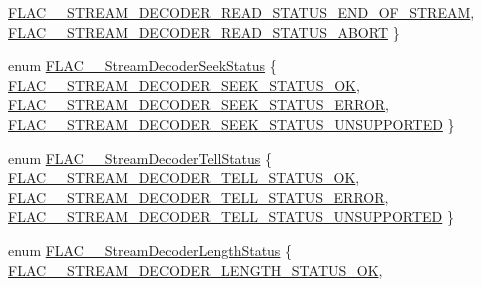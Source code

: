 \begin{DoxyCompactItemize}
\mbox{\hyperlink{group__flac__stream__decoder_ggad793ead451206c64a91dc0b851027b93a0a0687d25dc9f7163e6e5e294672170f}{F\+L\+A\+C\+\_\+\+\_\+\+S\+T\+R\+E\+A\+M\+\_\+\+D\+E\+C\+O\+D\+E\+R\+\_\+\+R\+E\+A\+D\+\_\+\+S\+T\+A\+T\+U\+S\+\_\+\+E\+N\+D\+\_\+\+O\+F\+\_\+\+S\+T\+R\+E\+AM}}, 
\mbox{\hyperlink{group__flac__stream__decoder_ggad793ead451206c64a91dc0b851027b93a923123aebb349e35662e35a7621b7535}{F\+L\+A\+C\+\_\+\+\_\+\+S\+T\+R\+E\+A\+M\+\_\+\+D\+E\+C\+O\+D\+E\+R\+\_\+\+R\+E\+A\+D\+\_\+\+S\+T\+A\+T\+U\+S\+\_\+\+A\+B\+O\+RT}}
 \}
\item 
enum \mbox{\hyperlink{group__flac__stream__decoder_gac8d269e3c7af1a5889d3bd38409ed67d}{F\+L\+A\+C\+\_\+\+\_\+\+Stream\+Decoder\+Seek\+Status}} \{ \mbox{\hyperlink{group__flac__stream__decoder_ggac8d269e3c7af1a5889d3bd38409ed67daca58132d896ad7755827d3f2b72488cc}{F\+L\+A\+C\+\_\+\+\_\+\+S\+T\+R\+E\+A\+M\+\_\+\+D\+E\+C\+O\+D\+E\+R\+\_\+\+S\+E\+E\+K\+\_\+\+S\+T\+A\+T\+U\+S\+\_\+\+OK}}, 
\mbox{\hyperlink{group__flac__stream__decoder_ggac8d269e3c7af1a5889d3bd38409ed67da969ce92a42a2a95609452e9cf01fcc09}{F\+L\+A\+C\+\_\+\+\_\+\+S\+T\+R\+E\+A\+M\+\_\+\+D\+E\+C\+O\+D\+E\+R\+\_\+\+S\+E\+E\+K\+\_\+\+S\+T\+A\+T\+U\+S\+\_\+\+E\+R\+R\+OR}}, 
\mbox{\hyperlink{group__flac__stream__decoder_ggac8d269e3c7af1a5889d3bd38409ed67da4a01f1e48baf015e78535cc20683ec53}{F\+L\+A\+C\+\_\+\+\_\+\+S\+T\+R\+E\+A\+M\+\_\+\+D\+E\+C\+O\+D\+E\+R\+\_\+\+S\+E\+E\+K\+\_\+\+S\+T\+A\+T\+U\+S\+\_\+\+U\+N\+S\+U\+P\+P\+O\+R\+T\+ED}}
 \}
\item 
enum \mbox{\hyperlink{group__flac__stream__decoder_ga83708207969383bd7b5c1e9148528845}{F\+L\+A\+C\+\_\+\+\_\+\+Stream\+Decoder\+Tell\+Status}} \{ \mbox{\hyperlink{group__flac__stream__decoder_gga83708207969383bd7b5c1e9148528845a516a202ebf4bb61d4a1fb5b029a104dd}{F\+L\+A\+C\+\_\+\+\_\+\+S\+T\+R\+E\+A\+M\+\_\+\+D\+E\+C\+O\+D\+E\+R\+\_\+\+T\+E\+L\+L\+\_\+\+S\+T\+A\+T\+U\+S\+\_\+\+OK}}, 
\mbox{\hyperlink{group__flac__stream__decoder_gga83708207969383bd7b5c1e9148528845aceefd3feb853d5e68a149f2bdd1a9db1}{F\+L\+A\+C\+\_\+\+\_\+\+S\+T\+R\+E\+A\+M\+\_\+\+D\+E\+C\+O\+D\+E\+R\+\_\+\+T\+E\+L\+L\+\_\+\+S\+T\+A\+T\+U\+S\+\_\+\+E\+R\+R\+OR}}, 
\mbox{\hyperlink{group__flac__stream__decoder_gga83708207969383bd7b5c1e9148528845add75538234493c9f7a20a846a223ca91}{F\+L\+A\+C\+\_\+\+\_\+\+S\+T\+R\+E\+A\+M\+\_\+\+D\+E\+C\+O\+D\+E\+R\+\_\+\+T\+E\+L\+L\+\_\+\+S\+T\+A\+T\+U\+S\+\_\+\+U\+N\+S\+U\+P\+P\+O\+R\+T\+ED}}
 \}
\item 
enum \mbox{\hyperlink{group__flac__stream__decoder_gad5860157c2bb34501b8b9370472d727a}{F\+L\+A\+C\+\_\+\+\_\+\+Stream\+Decoder\+Length\+Status}} \{ \mbox{\hyperlink{group__flac__stream__decoder_ggad5860157c2bb34501b8b9370472d727aaef01bfcdc3099686e106d8f88397653d}{F\+L\+A\+C\+\_\+\+\_\+\+S\+T\+R\+E\+A\+M\+\_\+\+D\+E\+C\+O\+D\+E\+R\+\_\+\+L\+E\+N\+G\+T\+H\+\_\+\+S\+T\+A\+T\+U\+S\+\_\+\+OK}}, 

\end{DoxyCompactItemize}
